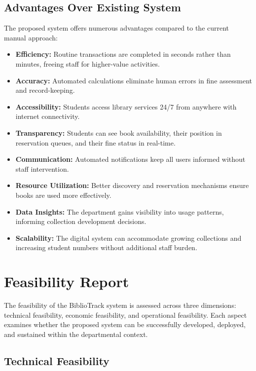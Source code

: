\documentclass[12pt,a4paper]{report}
\begin{document}
\subsection{Advantages Over Existing System}

The proposed system offers numerous advantages compared to the current manual approach:

\begin{itemize}
    \item \textbf{Efficiency:} Routine transactions are completed in seconds rather than minutes, freeing staff for higher-value activities.
    \item \textbf{Accuracy:} Automated calculations eliminate human errors in fine assessment and record-keeping.
    \item \textbf{Accessibility:} Students access library services 24/7 from anywhere with internet connectivity.
    \item \textbf{Transparency:} Students can see book availability, their position in reservation queues, and their fine status in real-time.
    \item \textbf{Communication:} Automated notifications keep all users informed without staff intervention.
    \item \textbf{Resource Utilization:} Better discovery and reservation mechanisms ensure books are used more effectively.
    \item \textbf{Data Insights:} The department gains visibility into usage patterns, informing collection development decisions.
    \item \textbf{Scalability:} The digital system can accommodate growing collections and increasing student numbers without additional staff burden.
\end{itemize}

\section{Feasibility Report}
\label{sec:feasibility}

The feasibility of the BiblioTrack system is assessed across three dimensions: technical feasibility, economic feasibility, and operational feasibility. Each aspect examines whether the proposed system can be successfully developed, deployed, and sustained within the departmental context.

\subsection{Technical Feasibility}
\label{subsec:technical}
\end{document}
